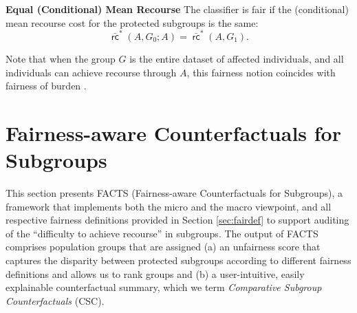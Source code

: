 \documentclass{article}
\DeclareMathOperator{\rc}{\mathsf{rc}}
\newtheorem{definition}{Definition}[section]
\begin{document}

\smallskip\noindent\textbf{Equal (Conditional) Mean Recourse}
%
The classifier is fair if the (conditional) mean recourse cost for the protected subgroups is the same: 
%
\[
\bar{\rc}^*(A,G_{0};A) = \bar{\rc}^*(A, G_{1}).
\]
%

Note that when the group $G$ is the entire dataset of affected individuals, and all individuals can achieve recourse through $A$, this fairness notion coincides with fairness of burden \cite{ustun2019actionable,2020_AIES_SHG}.






% 

\section{Fairness-aware Counterfactuals for Subgroups}
\label{sec:method}

This section presents FACTS (Fairness-aware Counterfactuals for Subgroups), a framework that implements both the micro and the macro viewpoint, and all respective fairness definitions provided in Section \ref{sec:fairdef} to support auditing of the ``difficulty to achieve recourse'' in subgroups. The output of FACTS comprises population groups that are assigned (a) an unfairness score that captures the disparity between protected subgroups according to different fairness definitions and allows us to rank groups and (b) a user-intuitive, easily explainable counterfactual summary, which we term \emph{Comparative Subgroup Counterfactuals} (CSC).
\end{document}

